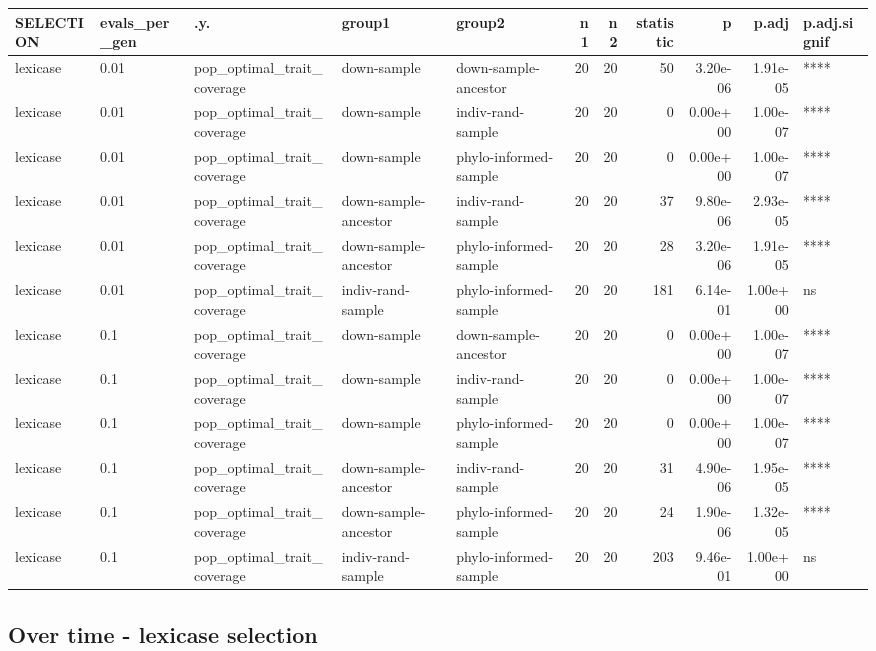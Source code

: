 \documentclass[
]{book}
\begin{document}
\begin{tabular}{l|l|l|l|l|r|r|r|r|r|l}
\hline
SELECTION & evals\_per\_gen & .y. & group1 & group2 & n1 & n2 & statistic & p & p.adj & p.adj.signif\\
\hline
lexicase & 0.01 & pop\_optimal\_trait\_coverage & down-sample & down-sample-ancestor & 20 & 20 & 50 & 3.20e-06 & 1.91e-05 & ****\\
\hline
lexicase & 0.01 & pop\_optimal\_trait\_coverage & down-sample & indiv-rand-sample & 20 & 20 & 0 & 0.00e+00 & 1.00e-07 & ****\\
\hline
lexicase & 0.01 & pop\_optimal\_trait\_coverage & down-sample & phylo-informed-sample & 20 & 20 & 0 & 0.00e+00 & 1.00e-07 & ****\\
\hline
lexicase & 0.01 & pop\_optimal\_trait\_coverage & down-sample-ancestor & indiv-rand-sample & 20 & 20 & 37 & 9.80e-06 & 2.93e-05 & ****\\
\hline
lexicase & 0.01 & pop\_optimal\_trait\_coverage & down-sample-ancestor & phylo-informed-sample & 20 & 20 & 28 & 3.20e-06 & 1.91e-05 & ****\\
\hline
lexicase & 0.01 & pop\_optimal\_trait\_coverage & indiv-rand-sample & phylo-informed-sample & 20 & 20 & 181 & 6.14e-01 & 1.00e+00 & ns\\
\hline
lexicase & 0.1 & pop\_optimal\_trait\_coverage & down-sample & down-sample-ancestor & 20 & 20 & 0 & 0.00e+00 & 1.00e-07 & ****\\
\hline
lexicase & 0.1 & pop\_optimal\_trait\_coverage & down-sample & indiv-rand-sample & 20 & 20 & 0 & 0.00e+00 & 1.00e-07 & ****\\
\hline
lexicase & 0.1 & pop\_optimal\_trait\_coverage & down-sample & phylo-informed-sample & 20 & 20 & 0 & 0.00e+00 & 1.00e-07 & ****\\
\hline
lexicase & 0.1 & pop\_optimal\_trait\_coverage & down-sample-ancestor & indiv-rand-sample & 20 & 20 & 31 & 4.90e-06 & 1.95e-05 & ****\\
\hline
lexicase & 0.1 & pop\_optimal\_trait\_coverage & down-sample-ancestor & phylo-informed-sample & 20 & 20 & 24 & 1.90e-06 & 1.32e-05 & ****\\
\hline
lexicase & 0.1 & pop\_optimal\_trait\_coverage & indiv-rand-sample & phylo-informed-sample & 20 & 20 & 203 & 9.46e-01 & 1.00e+00 & ns\\
\hline
\end{tabular}

\hypertarget{over-time---lexicase-selection}{%
\subsection{Over time - lexicase selection}\label{over-time---lexicase-selection}}
\end{document}
